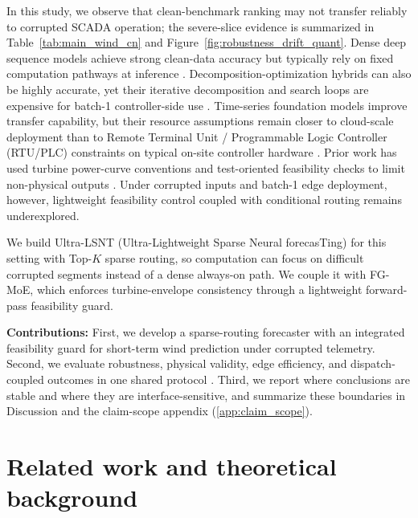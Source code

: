 \documentclass[review,1p,times]{elsarticle}
\begin{document}
In this study, we observe that clean-benchmark ranking may not transfer reliably to corrupted SCADA operation; the severe-slice evidence is summarized in Table~\ref{tab:main_wind_cn} and Figure~\ref{fig:robustness_drift_quant}. Dense deep sequence models achieve strong clean-data accuracy but typically rely on fixed computation pathways at inference \citep{wu2021autoformer,zhou2022fedformer,nie2023patchtst,liu2024itransformer,gu2023mamba}. Decomposition-optimization hybrids can also be highly accurate, yet their iterative decomposition and search loops are expensive for batch-1 controller-side use \citep{zhang2021windreview,li2023vmdcnn,xue2020ssawind,niu2020ceemdanbi,duan2025robust}. Time-series foundation models improve transfer capability, but their resource assumptions remain closer to cloud-scale deployment than to Remote Terminal Unit / Programmable Logic Controller (RTU/PLC) constraints on typical on-site controller hardware \citep{ansari2024chronos,woo2024moirai,liu2024moiraimoe,das2024decoderonly,shi2025timemoe}. Prior work has used turbine power-curve conventions and test-oriented feasibility checks to limit non-physical outputs \citep{burton2011wind,iec61400_12_1_2017}. Under corrupted inputs and batch-1 edge deployment, however, lightweight feasibility control coupled with conditional routing remains underexplored.

We build Ultra-LSNT (Ultra-Lightweight Sparse Neural forecasTing) for this setting with Top-$K$ sparse routing, so computation can focus on difficult corrupted segments instead of a dense always-on path. We couple it with FG-MoE, which enforces turbine-envelope consistency through a lightweight forward-pass feasibility guard.

\textbf{Contributions:} First, we develop a sparse-routing forecaster with an integrated feasibility guard for short-term wind prediction under corrupted telemetry. Second, we evaluate robustness, physical validity, edge efficiency, and dispatch-coupled outcomes in one shared protocol \mbox{\citep{stott2009dcpf,li2024opfhighren,khaloie2025opfml,yan2025economicvalue}}. Third, we report where conclusions are stable and where they are interface-sensitive, and summarize these boundaries in Discussion and the claim-scope appendix (\ref{app:claim_scope}).

\section{Related work and theoretical background}
\label{sec:related}
\end{document}
